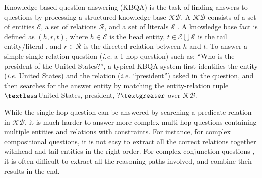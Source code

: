 Knowledge-based question answering (KBQA) is the task of finding answers to questions by processing a structured knowledge base $\mathcal{KB}$. %
A $\mathcal{KB}$ consists of a set of entities $\mathcal{E}$, a set of relations $\mathcal{R}$, and a set of literals $\mathcal{S}$ . A knowledge base fact is defined as $(h,r,t)$, where $h\in \mathcal{E}$ is the head entity, $t \in \mathcal{E} \bigcup \mathcal{S}$ is the tail entity/literal , and $r\in \mathcal{R}$ is the directed relation between $h$ and $t$. To answer a simple single-relation question (\emph{i.e.} a 1-hop question) such as: ``Who is the president of the United States?'', %
a typical KBQA system first identifies the entity (\emph{i.e.} United States) and the relation (\emph{i.e.} ``president'') asked in the question, and then searches for the answer entity by matching the entity-relation tuple $\textless$United States, president, $?\textgreater$ over $\mathcal{KB}$.


While the single-hop question can be answered by searching a predicate relation in $\mathcal{KB}$, it is much harder to answer more complex multi-hop questions containing multiple entities and relations with constraints. For instance, for complex compositional questions, it is not easy to extract all the correct relations together withhead and tail entities in the right order. For complex conjunction questions , it is often difficult to extract all the reasoning paths involved, and combine their results in the end. 

